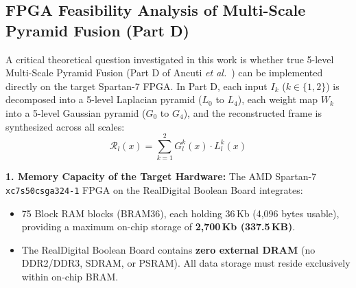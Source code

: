 \documentclass[10pt,twocolumn,letterpaper]{article}
\begin{document}
{\subsection{FPGA Feasibility Analysis of Multi-Scale Pyramid Fusion (Part D)}
\label{subsec:multiscale_feasibility}

A critical theoretical question investigated in this work is whether true 5-level Multi-Scale Pyramid Fusion (Part D of Ancuti \emph{et al.}~\cite{ancuti2018color}) can be implemented directly on the target Spartan-7 FPGA. In Part D, each input $I_k$ ($k \in \{1, 2\}$) is decomposed into a 5-level Laplacian pyramid ($L_0$ to $L_4$), each weight map $W_k$ into a 5-level Gaussian pyramid ($G_0$ to $G_4$), and the reconstructed frame is synthesized across all scales:
\begin{equation}
  \mathcal{R}_l(x) = \sum_{k=1}^{2} G_l^k(x) \cdot L_l^k(x)
\end{equation}

\textbf{1. Memory Capacity of the Target Hardware:}
The AMD Spartan-7 \texttt{xc7s50csga324-1} FPGA on the RealDigital Boolean Board integrates:
\begin{itemize}
    \item 75 Block RAM blocks (BRAM36), each holding 36\,Kb (4,096 bytes usable), providing a maximum on-chip storage of \textbf{2,700\,Kb (337.5\,KB)}.
    \item The RealDigital Boolean Board contains \textbf{zero external DRAM} (no DDR2/DDR3, SDRAM, or PSRAM). All data storage must reside exclusively within on-chip BRAM.
\end{itemize}

}
\end{document}
